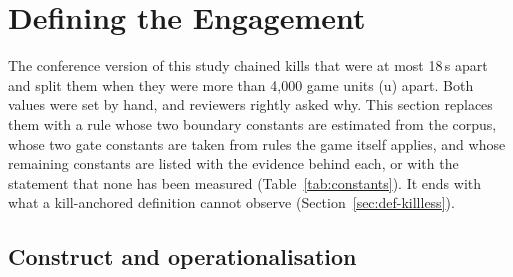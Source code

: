 \section{Defining the Engagement}\label{sec:definition}

The conference version of this study chained kills that were at most 18\,s apart and split them when
they were more than 4,000 game units (u) apart. Both values were set by hand, and reviewers rightly
asked why. This section replaces them with a rule whose two boundary constants are estimated from the
corpus, whose two gate constants are taken from rules the game itself applies, and whose remaining
constants are listed with the evidence behind each, or with the statement that none has been measured
(Table~\ref{tab:constants}). It ends with what a kill-anchored definition cannot observe
(Section~\ref{sec:def-killless}).

\subsection{Construct and operationalisation}

